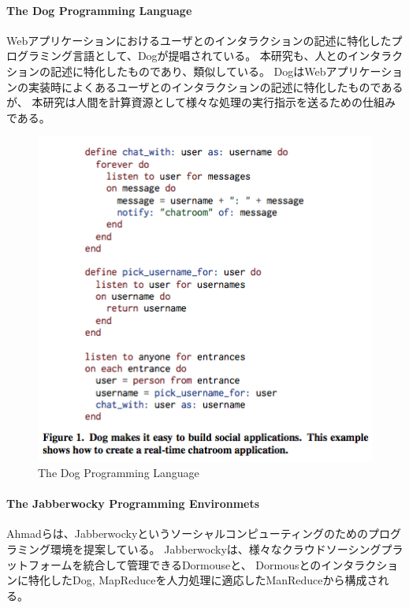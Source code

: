 \paragraph{The Dog Programming
Language}\label{the-dog-programming-language}

\mbox{}

Webアプリケーションにおけるユーザとのインタラクションの記述に特化したプログラミング言語として、Dog\cite{dog}が提唱されている。
本研究も、人とのインタラクションの記述に特化したものであり、類似している。
DogはWebアプリケーションの実装時によくあるユーザとのインタラクションの記述に特化したものであるが、
本研究は人間を計算資源として様々な処理の実行指示を送るための仕組みである。

\begin{figure}[htbp]
  \begin{center}
  \includegraphics[width=.6\linewidth,bb=0 0 426 414]{images/dog.png}
  \end{center}
  \caption{The Dog Programming Language}
  \label{fig:dog}
\end{figure}

\paragraph{The Jabberwocky Programming
Environmets}\label{the-jabberwocky-programming-environmets}

\mbox{}

Ahmadらは、Jabberwockyというソーシャルコンピューティングのためのプログラミング環境を提案している\cite{jabberwocky}。
Jabberwockyは、様々なクラウドソーシングプラットフォームを統合して管理できるDormouseと、
Dormousとのインタラクションに特化したDog,
MapReduceを人力処理に適応したManReduceから構成される。

